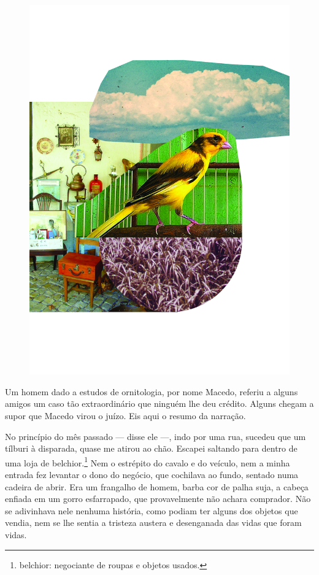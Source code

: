 \pagebreak
\thispagestyle{empty}
\begin{figure}
\vspace*{-.5cm}
\hspace*{-2.3cm}\includegraphics[width=140mm]{../ilustracoes/17_CANARIO.jpg}
\end{figure}
\pagebreak


\noindent{}Um homem dado a estudos de ornitologia, por nome Macedo, referiu a
alguns amigos um caso tão extraordinário que ninguém lhe deu crédito.
Alguns chegam a supor que Macedo virou o juízo. Eis aqui o resumo da
narração.

No princípio do mês passado --- disse ele ---, indo por uma rua, sucedeu
que um tílburi à disparada, quase me atirou ao chão. Escapei saltando
para dentro de uma loja de belchior.\footnote{belchior: negociante de
  roupas e objetos usados.} Nem o estrépito do cavalo e do veículo, nem
a minha entrada fez levantar o dono do negócio, que cochilava ao fundo,
sentado numa cadeira de abrir. Era um frangalho de homem, barba cor de
palha suja, a cabeça enfiada em um gorro esfarrapado, que provavelmente
não achara comprador. Não se adivinhava nele nenhuma história, como
podiam ter alguns dos objetos que vendia, nem se lhe sentia a tristeza
austera e desenganada das vidas que foram vidas.

